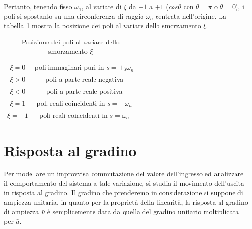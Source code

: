 \documentclass[a4paper]{report}
\begin{document}
Pertanto, tenendo fisso $\omega_n$, al variare di $\xi$ da $-1$ a $+1$
($cos \theta$ con $\theta = \pi$ o $\theta = 0$), i poli si spostanto
su una circonferenza di raggio $\omega_n$ centrata nell'origine. La
tabella \ref{tab:tabsmorz} mostra la posizione dei poli al variare
dello smorzamento $\xi$.
\begin{table}[!h]
\begin{center}
\begin{tabular}{c|c}
\hline
$\xi=0$ & poli immaginari puri in $s = \pm j\omega_n$\\
$\xi>0$ & poli a parte reale negativa\\
$\xi<0$ & poli a parte reale positiva\\
$\xi=1$ & poli reali coincidenti in $s = -\omega_n$\\
$\xi=-1$ & poli reali coincidenti in $s = \omega_n$\\
\hline
\end{tabular}
\caption{Posizione dei poli al variare dello smorzamento $\xi$}
\label{tab:tabsmorz}
\end{center}
\end{table}

\section{Risposta al gradino}
Per modellare un'improvvisa commutazione del valore dell'ingresso ed
analizzare il comportamento del sistema a tale variazione, si studia
il movimento dell'uscita in risposta al gradino. Il gradino che
prenderemo in considerazione si suppone di ampiezza unitaria, in
quanto per la propriet\`a della linearit\`a, la risposta al gradino di
ampiezza $\bar{u}$ \`e semplicemente data da quella del gradino unitario
moltiplicata per $\bar{u}$.
\end{document}
